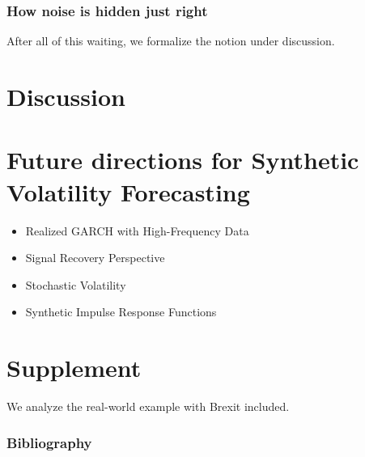 \documentclass{beamer}
\theoremstyle{definition}
\begin{document}
\begin{frame}
\frametitle{How noise is hidden just right}

\end{frame}

\begin{frame}
After all of this waiting, we formalize the notion under discussion.

\begin{definition}

\end{definition}
\end{frame}


\section{Discussion}

\section{Future directions for Synthetic Volatility Forecasting}

\begin{itemize}
\item{Realized GARCH with High-Frequency Data}

\item{Signal Recovery Perspective}

\item{Stochastic Volatility}

\item{Synthetic Impulse Response Functions}
\end{itemize}

\section{Supplement}
We analyze the real-world example with Brexit included.

\begin{frame}
    \frametitle{Bibliography}

\printbibliography
\end{frame}
\end{document}
